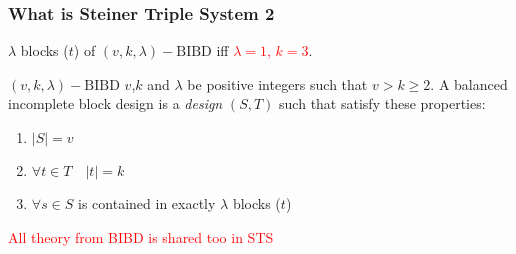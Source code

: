 	\begin{frame}
	\frametitle{What is Steiner Triple System 2}
	
	$\lambda$ blocks ($t$) of $(v,k,\lambda)-\mathrm{BIBD}$ iff \textcolor{red}{$\lambda = 1$, $k=3$}.
	
	\begin{block}{$(v,k,\lambda)-\mathrm{BIBD}$}
		$v$,$k$ and $\lambda$ be positive integers such that $v > k \ge 2$. A balanced incomplete block design is a \textit{design} $(S,T)$ such that satisfy these properties:
		\begin{enumerate}
			\item $|S|=v$
			\item $\forall t \in T\quad |t|= k $
			\item $\forall s \in S$ is contained in exactly $\lambda$ blocks ($t$) 
		\end{enumerate}
	\end{block}
	\pause
	\textcolor{red}{All theory from BIBD is shared too in STS}
	
	\end{frame}


